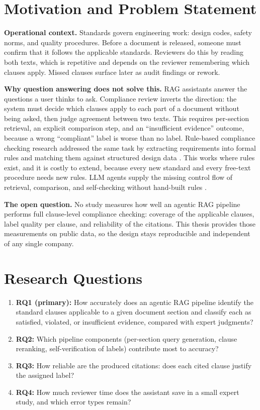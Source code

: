 \documentclass[10pt,a4paper]{article}
\begin{document}
\section{Motivation and Problem Statement}

\textbf{Operational context.} Standards govern engineering work: design codes, safety norms, and quality procedures. Before a document is released, someone must confirm that it follows the applicable standards. Reviewers do this by reading both texts, which is repetitive and depends on the reviewer remembering which clauses apply. Missed clauses surface later as audit findings or rework.

\textbf{Why question answering does not solve this.} RAG assistants answer the questions a user thinks to ask. Compliance review inverts the direction: the system must decide which clauses apply to each part of a document without being asked, then judge agreement between two texts. This requires per-section retrieval, an explicit comparison step, and an ``insufficient evidence'' outcome, because a wrong ``compliant'' label is worse than no label. Rule-based compliance checking research addressed the same task by extracting requirements into formal rules and matching them against structured design data \cite{zhang2016}. This works where rules exist, and it is costly to extend, because every new standard and every free-text procedure needs new rules. LLM agents supply the missing control flow of retrieval, comparison, and self-checking without hand-built rules \cite{yao2023react, singh2025agentic}.

\textbf{The open question.} No study measures how well an agentic RAG pipeline performs full clause-level compliance checking: coverage of the applicable clauses, label quality per clause, and reliability of the citations. This thesis provides those measurements on public data, so the design stays reproducible and independent of any single company.

\section{Research Questions}

\begin{enumerate}
    \item \textbf{RQ1 (primary):} How accurately does an agentic RAG pipeline identify the standard clauses applicable to a given document section and classify each as satisfied, violated, or insufficient evidence, compared with expert judgments?
    \item \textbf{RQ2:} Which pipeline components (per-section query generation, clause reranking, self-verification of labels) contribute most to accuracy?
    \item \textbf{RQ3:} How reliable are the produced citations: does each cited clause justify the assigned label?
    \item \textbf{RQ4:} How much reviewer time does the assistant save in a small expert study, and which error types remain?
\end{enumerate}
\end{document}
